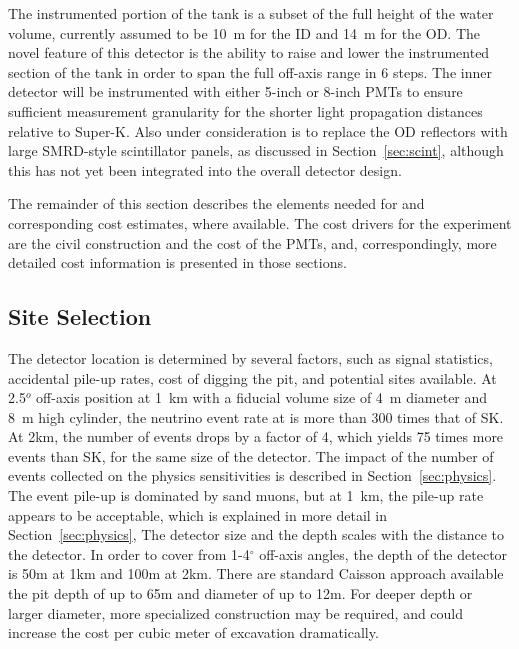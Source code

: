 The instrumented portion of the tank is a subset of the full height of the water volume, currently assumed to be 10~m for the ID and 14~m for the OD. The novel feature of this detector is the ability to raise and lower the instrumented section of the tank in order to span the full off-axis range in 6 steps. The inner detector will be instrumented with either 5-inch or 8-inch PMTs to ensure sufficient measurement granularity for the shorter light propagation distances relative to Super-K. Also under consideration is to replace the OD reflectors with large SMRD-style scintillator panels, as discussed in Section~\ref{sec:scint}, although this has not yet been integrated into the overall detector design.

The remainder of this section describes the elements needed for \nuprism and corresponding cost estimates, where available. The cost drivers for the experiment are the civil construction and the cost of the PMTs, and, correspondingly, more detailed cost information is presented in those sections.



\subsection{Site Selection}

The \nuprism detector location is determined by several factors, such as signal statistics, accidental pile-up rates, cost of digging the pit, and potential sites available.
At 2.5$^o$ off-axis position at 1~km with a fiducial volume size of 4~m diameter and 8~m high cylinder, the neutrino event rate at \nuprism is more than 300 times that of SK. At 2km, the number of events drops by a factor of 4, which yields 75 times more events than SK, for the same size of the detector. The impact of the number of events collected on the physics sensitivities is described in Section~\ref{sec:physics}. The event pile-up is dominated by sand muons, but at 1~km, the pile-up rate appears to be acceptable, which is explained in more detail in Section~\ref{sec:physics},  The detector size and the depth scales with the distance to the \nuprism detector. In order to cover from 1-4$^\circ$ off-axis angles, the depth of the detector is 50m at 1km and 100m at 2km. There are standard Caisson approach available the pit depth of up to 65m and diameter of up to 12m. For deeper depth or larger diameter, more specialized construction may be required, and could increase the cost per cubic meter of excavation dramatically. 


